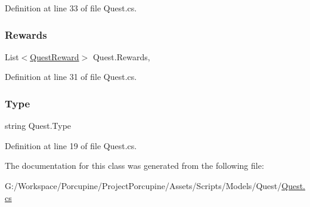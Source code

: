 Definition at line 33 of file Quest.\+cs.

\mbox{\label{class_quest_a5b90df0034d0798ec3ba92c55b6f8118}} 
\subsubsection{\texorpdfstring{Rewards}{Rewards}}
{\footnotesize\ttfamily List$<$\hyperlink{class_quest_reward}{Quest\+Reward}$>$ Quest.\+Rewards\hspace{0.3cm}{\ttfamily [get]}, {\ttfamily [set]}}



Definition at line 31 of file Quest.\+cs.

\mbox{\label{class_quest_a8dbdb675c319dd32654bf6b1ea66db01}} 
\subsubsection{\texorpdfstring{Type}{Type}}
{\footnotesize\ttfamily string Quest.\+Type\hspace{0.3cm}{\ttfamily [get]}}



Definition at line 19 of file Quest.\+cs.



The documentation for this class was generated from the following file\+:\begin{DoxyCompactItemize}
\item 
G\+:/\+Workspace/\+Porcupine/\+Project\+Porcupine/\+Assets/\+Scripts/\+Models/\+Quest/\hyperlink{_quest_8cs}{Quest.\+cs}\end{DoxyCompactItemize}
